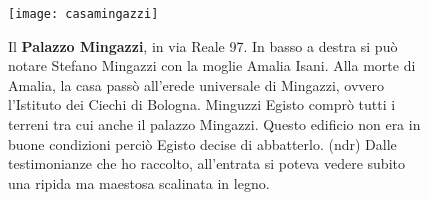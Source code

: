\newpage

 \begin{figure}[htb]
    \centering
    \texttt{[image: casamingazzi]}
    \caption[Palazzo Mingazzi]{Il \textbf{Palazzo Mingazzi}, in via Reale 97. In basso a destra si può notare Stefano Mingazzi con la moglie Amalia Isani. Alla morte di Amalia, la casa passò all'erede universale di Mingazzi, ovvero l'Istituto dei Ciechi di Bologna. Minguzzi Egisto comprò tutti i terreni tra cui anche il palazzo Mingazzi. Questo edificio non era in buone condizioni perciò Egisto decise di abbatterlo. (ndr) Dalle testimonianze che ho raccolto, all'entrata si poteva vedere subito una ripida ma maestosa scalinata in legno.\label{fig:casamingazzi}}
\end{figure}



































%